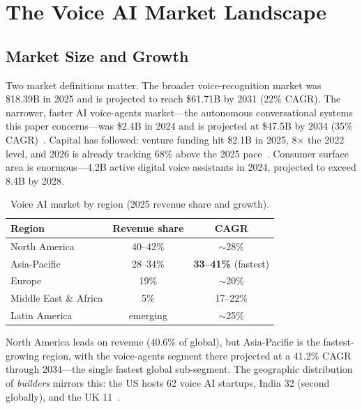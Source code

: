 \documentclass[blind]{gtac}
\begin{document}
\section{The Voice AI Market Landscape}
\label{sec:landscape}

\subsection{Market Size and Growth}

Two market definitions matter. The broader voice-recognition market was \$18.39B in 2025 and is projected to reach \$61.71B by 2031 (22\% CAGR). The narrower, faster AI voice-agents market---the autonomous conversational systems this paper concerns---was \$2.4B in 2024 and is projected at \$47.5B by 2034 (35\% CAGR)~\cite{grandview}. Capital has followed: venture funding hit \$2.1B in 2025, 8$\times$ the 2022 level, and 2026 is already tracking 68\% above the 2025 pace~\cite{assemblyai_2026}. Consumer surface area is enormous---4.2B active digital voice assistants in 2024, projected to exceed 8.4B by 2028.

\begin{table}[H]
\centering
\caption{Voice AI market by region (2025 revenue share and growth).}
\label{tab:region}
\tiny
\begin{tabular}{@{}lcc@{}}
\toprule
Region & Revenue share & CAGR \\
\midrule
North America & 40--42\% & $\sim$28\% \\
Asia-Pacific & 28--34\% & \textbf{33--41\%} (fastest) \\
Europe & 19\% & $\sim$20\% \\
Middle East \& Africa & 5\% & 17--22\% \\
Latin America & emerging & $\sim$25\% \\
\bottomrule
\end{tabular}
\end{table}

North America leads on revenue (40.6\% of global), but Asia-Pacific is the fastest-growing region, with the voice-agents segment there projected at a 41.2\% CAGR through 2034---the single fastest global sub-segment. The geographic distribution of \emph{builders} mirrors this: the US hosts 62 voice AI startups, India 32 (second globally), and the UK 11~\cite{assemblyai_2026}.
\end{document}
